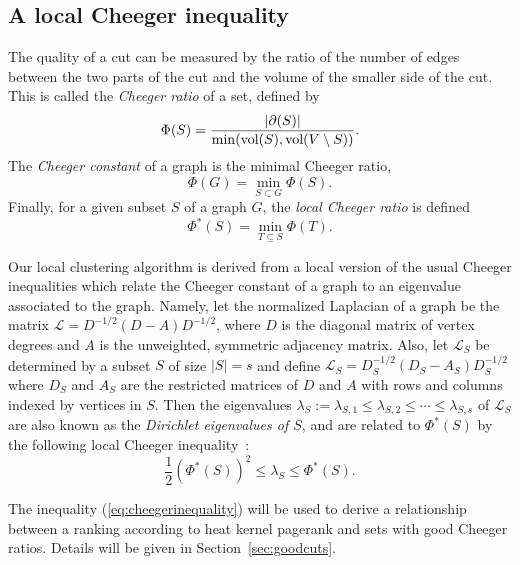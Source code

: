 \documentclass[runningheads,a4paper]{llncs}
\newcommand{\vol}{\textmd{vol}}
\renewcommand{\L}{\mathcal{L}}
\newcommand{\localcheeg}{\Phi^*(S)}
\begin{document}
\subsection{A local Cheeger inequality}
The quality of a cut can be measured by the ratio of the number of edges between
the two parts of the cut and the volume of the smaller side of the cut.  This is
called the \emph{Cheeger ratio} of a set, defined by
\begin{equation*}
\Phi(S) = \frac{ |\partial(S)|  }{ \min(\vol(S), \vol(V\setminus S)) }.
\end{equation*}
The \emph{Cheeger constant} of a graph is the minimal Cheeger ratio,
\begin{equation*}
\Phi(G) = \min_{S\subset G}\Phi(S).
\end{equation*}
Finally, for a given subset $S$ of a graph $G$, the \emph{local Cheeger ratio}
is defined
\begin{equation*}
\localcheeg = \min\limits_{T \subseteq S}\Phi(T).
\end{equation*}

Our local clustering algorithm is derived from a local version of the usual
Cheeger inequalities which relate the Cheeger constant of a graph to an
eigenvalue associated to the graph.  Namely, let the normalized Laplacian of a
graph be the matrix $\L = D^{-1/2}(D-A)D^{-1/2}$, where $D$ is the diagonal
matrix of vertex degrees and $A$ is the unweighted, symmetric adjacency matrix.
Also, let $\L_S$ be determined by a subset $S$ of size $|S|=s$ and define $\L_S
= D_S^{-1/2}(D_S-A_S)D_S^{-1/2}$ where $D_S$ and $A_S$ are the restricted
matrices of $D$ and $A$ with rows and columns indexed by vertices in $S$.  Then
the eigenvalues $\lambda_S := \lambda_{S,1} \leq \lambda_{S,2} \leq \cdots \leq
\lambda_{S,s}$ of $\L_S$ are also known as the \emph{Dirichlet eigenvalues of
$S$}, and are related to $\localcheeg$ by the following local Cheeger
inequality~\cite{chung:partitionhkpr:im09}:
\begin{equation}\label{eq:cheegerinequality}
\frac{1}{2}(\localcheeg)^2 \leq \lambda_S \leq \localcheeg.
\end{equation}

The inequality (\ref{eq:cheegerinequality}) will be used to derive a
relationship between a ranking according to heat kernel pagerank and sets with
good Cheeger ratios.  Details will be given in Section~\ref{sec:goodcuts}.
\end{document}
